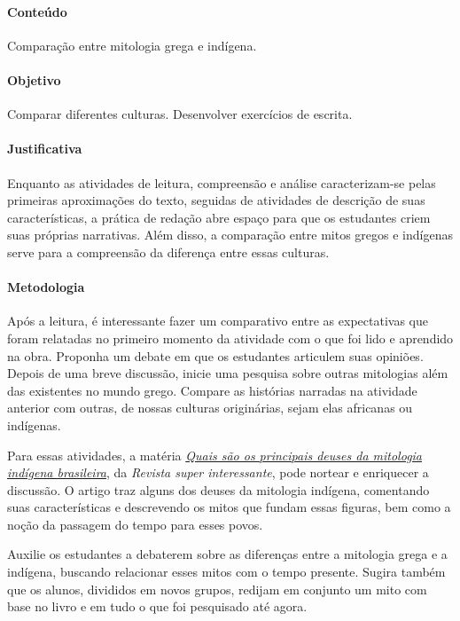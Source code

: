 \documentclass[11pt]{extarticle}
\begin{document}
\paragraph{Conteúdo} Comparação entre mitologia grega e indígena.

\paragraph{Objetivo} Comparar diferentes culturas. Desenvolver exercícios de escrita.

\paragraph{Justificativa} Enquanto as atividades de leitura, compreensão e análise caracterizam-se pelas primeiras aproximações do texto, seguidas de atividades de descrição de suas características, a prática de redação abre espaço para que os estudantes criem suas próprias narrativas. Além disso, a comparação entre mitos gregos e indígenas serve para a compreensão da diferença entre essas culturas. 

\paragraph{Metodologia} Após a leitura, é interessante fazer um comparativo entre as expectativas que foram relatadas no primeiro momento da atividade com o que foi lido e aprendido na obra. Proponha um debate em que os estudantes articulem suas opiniões. Depois de uma breve discussão, inicie uma pesquisa sobre outras mitologias além das existentes no mundo grego. Compare as histórias narradas na atividade anterior com outras, de nossas culturas originárias, sejam elas africanas ou indígenas.  

Para essas atividades, a matéria \href{https://super.abril.com.br/mundo-estranho/quais-sao-os-principais-deuses-da-mitologia-indigena-brasileira/}{\textit{Quais são os principais deuses da mitologia indígena brasileira}}, da \textit{Revista super interessante}, pode nortear e enriquecer a discussão. O artigo traz alguns dos deuses da mitologia indígena, comentando suas características e descrevendo os mitos que fundam essas figuras, bem como a noção da passagem do tempo para esses povos. 

Auxilie os estudantes a debaterem sobre as diferenças entre a mitologia grega e a indígena, buscando relacionar esses mitos com o tempo presente. Sugira também que os alunos, divididos em novos grupos, redijam em conjunto um mito com base no livro e em tudo o que foi pesquisado até agora. 
\end{document}
